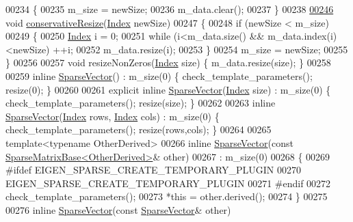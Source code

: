 \begin{DoxyCode}
00234     \{
00235       m\_size = newSize;
00236       m\_data.clear();
00237     \}
00238 
\hyperlink{group___sparse_core___module_ab8dbb1f73b6250c10c0860eb13ca5cca}{00246}     \textcolor{keywordtype}{void} \hyperlink{group___sparse_core___module_ab8dbb1f73b6250c10c0860eb13ca5cca}{conservativeResize}(\hyperlink{group___core___module_a554f30542cc2316add4b1ea0a492ff02}{Index} newSize)
00247     \{
00248       \textcolor{keywordflow}{if} (newSize < m\_size)
00249       \{
00250         \hyperlink{group___core___module_a554f30542cc2316add4b1ea0a492ff02}{Index} i = 0;
00251         \textcolor{keywordflow}{while} (i<m\_data.size() && m\_data.index(i)<newSize) ++i;
00252         m\_data.resize(i);
00253       \}
00254       m\_size = newSize;
00255     \}
00256 
00257     \textcolor{keywordtype}{void} resizeNonZeros(\hyperlink{group___core___module_a554f30542cc2316add4b1ea0a492ff02}{Index} size) \{ m\_data.resize(size); \}
00258 
00259     \textcolor{keyword}{inline} \hyperlink{group___sparse_core___module_class_eigen_1_1_sparse_vector}{SparseVector}() : m\_size(0) \{ check\_template\_parameters(); resize(0); \}
00260 
00261     \textcolor{keyword}{explicit} \textcolor{keyword}{inline} \hyperlink{group___sparse_core___module_class_eigen_1_1_sparse_vector}{SparseVector}(\hyperlink{group___core___module_a554f30542cc2316add4b1ea0a492ff02}{Index} size) : m\_size(0) \{ check\_template\_parameters(); 
      resize(size); \}
00262 
00263     \textcolor{keyword}{inline} \hyperlink{group___sparse_core___module_class_eigen_1_1_sparse_vector}{SparseVector}(\hyperlink{group___core___module_a554f30542cc2316add4b1ea0a492ff02}{Index} rows, \hyperlink{group___core___module_a554f30542cc2316add4b1ea0a492ff02}{Index} cols) : m\_size(0) \{ 
      check\_template\_parameters(); resize(rows,cols); \}
00264 
00265     \textcolor{keyword}{template}<\textcolor{keyword}{typename} OtherDerived>
00266     \textcolor{keyword}{inline} \hyperlink{group___sparse_core___module_class_eigen_1_1_sparse_vector}{SparseVector}(\textcolor{keyword}{const} \hyperlink{group___sparse_core___module_class_eigen_1_1_sparse_matrix_base}{SparseMatrixBase<OtherDerived>}& 
      other)
00267       : m\_size(0)
00268     \{
00269 \textcolor{preprocessor}{      #ifdef EIGEN\_SPARSE\_CREATE\_TEMPORARY\_PLUGIN}
00270         EIGEN\_SPARSE\_CREATE\_TEMPORARY\_PLUGIN
00271 \textcolor{preprocessor}{      #endif}
00272       check\_template\_parameters();
00273       *\textcolor{keyword}{this} = other.derived();
00274     \}
00275 
00276     \textcolor{keyword}{inline} \hyperlink{group___sparse_core___module_class_eigen_1_1_sparse_vector}{SparseVector}(\textcolor{keyword}{const} \hyperlink{group___sparse_core___module_class_eigen_1_1_sparse_vector}{SparseVector}& other)

\end{DoxyCode}
